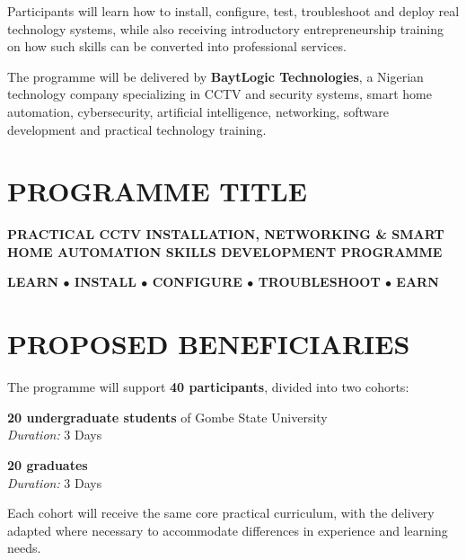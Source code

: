 \documentclass[11pt,a4paper]{article}
\begin{document}
Participants will learn how to install, configure, test, troubleshoot and deploy real technology systems, while also receiving introductory entrepreneurship training on how such skills can be converted into professional services.

The programme will be delivered by \textbf{BaytLogic Technologies}, a Nigerian technology company specializing in CCTV and security systems, smart home automation, cybersecurity, artificial intelligence, networking, software development and practical technology training.

\section{PROGRAMME TITLE}
\noindent\textbf{\large PRACTICAL CCTV INSTALLATION, NETWORKING \& SMART HOME AUTOMATION SKILLS DEVELOPMENT PROGRAMME}

\vspace{8pt}
\begin{tcolorbox}[themebox]
    {\Huge \textbf{LEARN $\bullet$ INSTALL $\bullet$ CONFIGURE $\bullet$ TROUBLESHOOT $\bullet$ EARN}}
\end{tcolorbox}

\section{PROPOSED BENEFICIARIES}
The programme will support \textbf{40 participants}, divided into two cohorts:

\begin{description}[style=multiline, leftmargin=3.5cm]
    \item[Cohort 1 — Students:] \textbf{20 undergraduate students} of Gombe State University \\
    \textit{Duration:} 3 Days
    \item[Cohort 2 — Graduates:] \textbf{20 graduates} \\
    \textit{Duration:} 3 Days
\end{description}

Each cohort will receive the same core practical curriculum, with the delivery adapted where necessary to accommodate differences in experience and learning needs.
\end{document}
